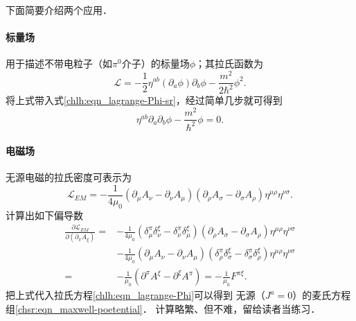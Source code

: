 
下面简要介绍两个应用．


\paragraph{标量场}
用于描述不带电粒子（如$\pi^0$介子）的标量场$\phi$；其拉氏函数为
\begin{equation}\label{chlh:eqn_scalar-field}
    \mathscr{L}=-\frac{1}{2} \eta^{ab} (\partial_a \phi) \partial_b \phi -\frac{m^2}{2 \hbar^2} \phi^2 .
\end{equation}
将上式带入式\eqref{chlh:eqn_lagrange-Phi-sr}，经过简单几步就可得到
\begin{equation}
    \eta^{ab} \partial_a \partial_b \phi - \frac{m^2}{\hbar^2} \phi =0 .
\end{equation}


\paragraph{电磁场} 
无源电磁的拉氏密度可表示为
\begin{equation}\label{chlh:eqn_EM-lag-den}
    \mathscr{L}_{EM} = -\frac{1}{4\mu_0}(\partial_\mu A_\nu - \partial_\nu A_\mu)
    (\partial_\rho A_\sigma - \partial_\sigma A_\rho) \eta^{\mu \rho} \eta^{\nu \sigma} .
\end{equation}
计算出如下偏导数
\begin{align*}
    \frac{\partial \mathscr{L}_{EM}} {\partial (\partial_\pi A_\xi )}
    =& -\frac{1}{4\mu_0}(\delta^\pi_\mu \delta^\xi_\nu - \delta^\pi_\nu \delta^\xi_\mu )
    (\partial_\rho A_\sigma - \partial_\sigma A_\rho) \eta^{\mu \rho} \eta^{\nu \sigma} \\
    &-\frac{1}{4\mu_0}(\partial_\mu A_\nu - \partial_\nu A_\mu)
    (\delta^\pi_\rho \delta^\xi_\sigma - \delta^\pi_\sigma \delta^\xi_\rho) \eta^{\mu \rho}\eta^{\nu \sigma}\\
    =& -\frac{1}{\mu_0}( \partial^\pi A^\xi - \partial^\xi A^\pi)
    = - \frac{1}{\mu_0}F^{\pi\xi}.
\end{align*}
把上式代入拉氏方程\eqref{chlh:eqn_lagrange-Phi}可以得到
无源（$J^a=0$）的麦氏方程组\eqref{chsr:eqn_maxwell-poetential}．
计算略繁、但不难，留给读者当练习．


